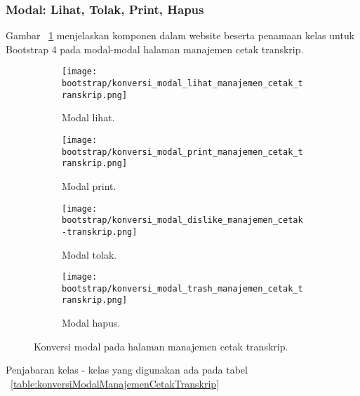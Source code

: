 \subsubsection{Modal: Lihat, Tolak, Print, Hapus}
\noindent Gambar ~\ref{fig:konversiModalManajemenCetakTranskrip} menjelaskan komponen dalam website beserta penamaan kelas untuk Bootstrap 4 pada modal-modal  halaman manajemen cetak transkrip.\\
\begin{figure}[h!]	
	\centering
	\begin{subfigure}[b]{0.6\linewidth}   
		\texttt{[image: bootstrap/konversi\_modal\_lihat\_manajemen\_cetak\_transkrip.png]}
		\caption{Modal lihat.} 
	\end{subfigure}
	\begin{subfigure}[b]{0.6\linewidth} 
		\texttt{[image: bootstrap/konversi\_modal\_print\_manajemen\_cetak\_transkrip.png]}
		\caption{Modal print.} 
	\end{subfigure}
	\begin{subfigure}[b]{0.6\linewidth}  
		\texttt{[image: bootstrap/konversi\_modal\_dislike\_manajemen\_cetak-transkrip.png]}
		\caption{Modal tolak.} 
	\end{subfigure}
	\begin{subfigure}[b]{0.6\linewidth} 
		\texttt{[image: bootstrap/konversi\_modal\_trash\_manajemen\_cetak\_transkrip.png]}
		\caption{Modal hapus.} 
	\end{subfigure}
	\caption{Konversi modal pada halaman manajemen cetak transkrip.}
	\label{fig:konversiModalManajemenCetakTranskrip}
\end{figure}
Penjabaran kelas - kelas yang digunakan ada pada tabel ~\ref{table:konversiModalManajemenCetakTranskrip}
